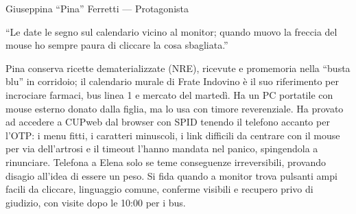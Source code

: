 \begin{personacard}{Giuseppina ``Pina'' Ferretti --- Protagonista}
\begin{minipage}[t]{0.72\linewidth}
\end{minipage}

\begin{personaquote}
``Le date le segno sul calendario vicino al monitor; quando muovo la freccia del mouse ho sempre paura di cliccare la cosa sbagliata.''
\end{personaquote}


Pina conserva ricette dematerializzate (NRE), ricevute e promemoria nella ``busta blu'' in corridoio; il calendario murale di Frate Indovino è il suo riferimento per incrociare farmaci, bus linea 1 e mercato del martedì. Ha un PC portatile con mouse esterno donato dalla figlia, ma lo usa con timore reverenziale. Ha provato ad accedere a CUPweb dal browser con SPID tenendo il telefono accanto per l'OTP: i menu fitti, i caratteri minuscoli, i link difficili da centrare con il mouse per via dell'artrosi e il timeout l'hanno mandata nel panico, spingendola a rinunciare. Telefona a Elena solo se teme conseguenze irreversibili, provando disagio all'idea di essere un peso. Si fida quando a monitor trova pulsanti ampi facili da cliccare, linguaggio comune, conferme visibili e recupero privo di giudizio, con visite dopo le 10:00 per i bus.



\end{personacard}
